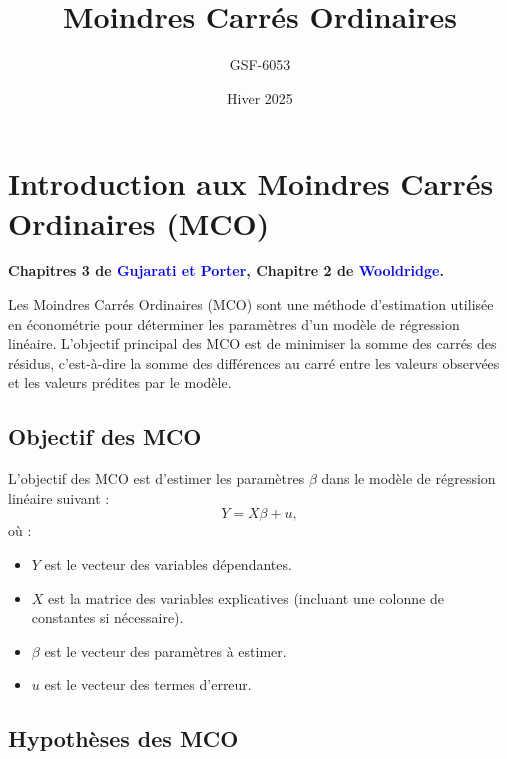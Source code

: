 \documentclass[14pt]{extarticle} %
\title{\textbf{Moindres Carrés Ordinaires}}
\author{GSF-6053}
\date{Hiver 2025}
\newcommand{\livre}[1]{\textcolor{blue}{#1}}
\begin{document}
\maketitle

\tableofcontents
\newpage

\onehalfspacing

\section{Introduction aux Moindres Carrés Ordinaires (MCO)}

\textbf{Chapitres 3 de \livre{Gujarati et Porter}, Chapitre 2 de \livre{Wooldridge}.}

Les Moindres Carrés Ordinaires (MCO) sont une méthode d'estimation utilisée en économétrie pour déterminer les paramètres d'un modèle de régression linéaire. L'objectif principal des MCO est de minimiser la somme des carrés des résidus, c'est-à-dire la somme des différences au carré entre les valeurs observées et les valeurs prédites par le modèle.

\subsection{Objectif des MCO}

L'objectif des MCO est d'estimer les paramètres \(\beta\) dans le modèle de régression linéaire suivant :
\[
Y = X\beta + u,
\]
où :
\begin{itemize}
    \item \(Y\) est le vecteur des variables dépendantes.
    \item \(X\) est la matrice des variables explicatives (incluant une colonne de constantes si nécessaire).
    \item \(\beta\) est le vecteur des paramètres à estimer.
    \item \(u\) est le vecteur des termes d'erreur.
\end{itemize}

\subsection{Hypothèses des MCO}
\end{document}
